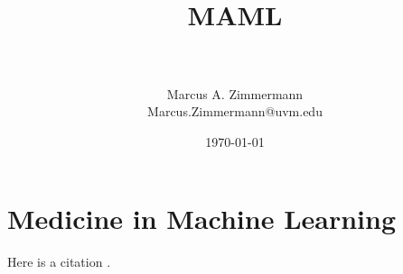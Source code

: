 \documentclass[letterpaper, 10pt,DIV=13]{scrartcl}
\title{	
   \normalfont \normalsize 
   \horrule{0.5pt} \\[0.25cm] 	%
   \huge MAML  \\     	    	%
   \horrule{0.5pt} \\[0.25cm] 	%
}
\author{Marcus A. Zimmermann \\ \normalsize Marcus.Zimmermann@uvm.edu}
\date{\normalsize\today} 	%
\numberwithin{equation}{section} %
\numberwithin{figure}{section} %
\numberwithin{table}{section} %
\begin{document}
\maketitle %

\section{Medicine in Machine Learning}

Here is a citation \cite{BOOK}.




\end{document}
